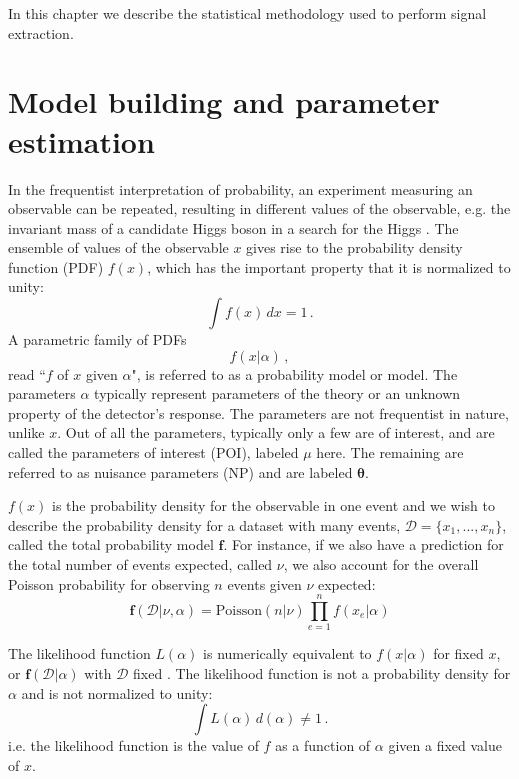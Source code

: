 In this chapter we describe the statistical methodology used to perform signal extraction. 

\section{Model building and parameter estimation}
In the frequentist interpretation of probability, an experiment measuring an observable can be repeated, resulting in different values of the observable, e.g. the invariant mass of a candidate Higgs boson in a search for the Higgs \cite{2011-Statistics-Cranmer}. The ensemble of values of the observable $x$ gives rise to the probability density function (PDF) $f(x)$, which has the important property that it is normalized to unity:
\begin{equation*}
    \int f(x) \, dx = 1 \,.
\end{equation*}
A parametric family of PDFs
\begin{equation*}
    f(x|\alpha) \, ,
\end{equation*}
read ``$f$ of $x$ given $\alpha$", is referred to as a probability model or model. The parameters $\alpha$ typically represent parameters of the theory or an unknown property of the detector's response. The parameters are not frequentist in nature, unlike $x$. Out of all the parameters, typically only a few are of interest, and are called the parameters of interest (POI), labeled $\mu$ here. The remaining are referred to as nuisance parameters (NP) \cite{2011-Statistics-Cranmer} and are labeled $\boldsymbol{\theta}$.

$f(x)$ is the probability density for the observable in one event and we wish to describe the probability density for a dataset with many events, $\mathcal{D} = \{x_1, ..., x_n\}$, called the total probability model $\boldsymbol{f}$. For instance, if we also have a prediction for the total number of events expected, called $\nu$, we also account for the overall Poisson probability for observing $n$ events given $\nu$ expected:
\begin{equation}
    \boldsymbol{f}(\mathcal{D}|\nu, \alpha) = \text{Poisson}(n|\nu) \prod_{e=1}^{n} f(x_e | \alpha)
\end{equation}

The likelihood function $L(\alpha)$ is numerically equivalent to $f(x|\alpha)$ for fixed $x$, or $\boldsymbol{f}(\mathcal{D}|\alpha)$ with $\mathcal{D}$ fixed \cite{2011-Statistics-Cranmer}. The likelihood function is not a probability density for $\alpha$ and is not normalized to unity:
\begin{equation*}
    \int L(\alpha) \, d(\alpha) \neq 1 \, .
\end{equation*}
i.e. the likelihood function is the value of $f$ as a function of $\alpha$ given a fixed value of $x$.

